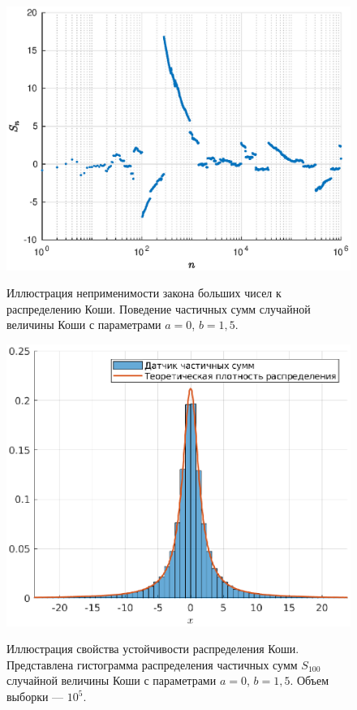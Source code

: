 \begin{figure}[t]
        \noindent
        \centering
        {
                \includegraphics[width=120mm]{task_05/cauchy-zbc.eps}
        }
        \caption{Иллюстрация неприменимости закона больших чисел к распределению Коши. Поведение частичных сумм случайной величины Коши с параметрами $a = 0$, $b = 1,5$.}
\end{figure}
\begin{figure}[b]
        \noindent
        \centering
        {
                \includegraphics[width=120mm]{task_05/cauchy0-1d5-100-100000.eps}
        }
        \caption{Иллюстрация свойства устойчивости распределения Коши. Представлена гистограмма распределения частичных сумм $S_{100}$ случайной величины Коши с параметрами $a = 0$, $b = 1,5$. Объем выборки --- $10^5$.}
\end{figure}